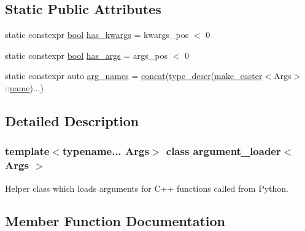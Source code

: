 \subsection*{Static Public Attributes}
\begin{DoxyCompactItemize}
\item 
static constexpr \mbox{\hyperlink{asdl_8h_af6a258d8f3ee5206d682d799316314b1}{bool}} \mbox{\hyperlink{classargument__loader_aefd489f954b4706554d6c4e7e705617f}{has\+\_\+kwargs}} = kwargs\+\_\+pos $<$ 0
\item 
static constexpr \mbox{\hyperlink{asdl_8h_af6a258d8f3ee5206d682d799316314b1}{bool}} \mbox{\hyperlink{classargument__loader_a9436dd2f1d26de4dcfb7e5f7edffef93}{has\+\_\+args}} = args\+\_\+pos $<$ 0
\item 
static constexpr auto \mbox{\hyperlink{classargument__loader_a48c33de6037140357b1ba8fd154cff59}{arg\+\_\+names}} = \mbox{\hyperlink{descr_8h_a0d8d147b3e705401458d3caec882e855}{concat}}(\mbox{\hyperlink{descr_8h_a65529edb79d0d99ef5b83524e2e0b0dc}{type\+\_\+descr}}(\mbox{\hyperlink{cast_8h_ab32b52411a6b07420516d79074815713}{make\+\_\+caster}}$<$Args$>$\+::\mbox{\hyperlink{structname}{name}})...)
\end{DoxyCompactItemize}


\subsection{Detailed Description}
\subsubsection*{template$<$typename... Args$>$\newline
class argument\+\_\+loader$<$ Args $>$}

Helper class which loads arguments for C++ functions called from Python. 

\subsection{Member Function Documentation}
\mbox{\label{classargument__loader_a5d84d64cfc5643563f65b0e21310ca6c}} 

